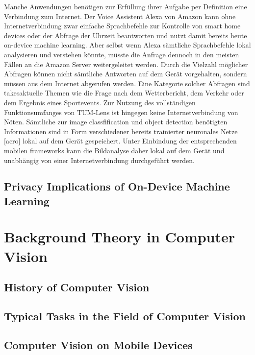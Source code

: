 \documentclass[
			   fontsize=11pt,
               paper=a4,
               bibliography=totoc,
               idxtotoc,
               headsepline,
               footsepline,
               footinclude=false,
               BCOR=12mm,
               DIV=13,
               openany,   %
               ]
               {scrbook}
\begin{document}
Manche Anwendungen benötigen zur Erfüllung ihrer Aufgabe per Definition eine Verbindung zum Internet. Der Voice Assistent Alexa von Amazon kann ohne Internetverbindung zwar einfache Sprachbefehle zur Kontrolle von smart home devices oder der Abfrage der Uhrzeit beantworten \cite{azn_local} und nutzt damit bereits heute on-device machine learning. Aber selbst wenn Alexa sämtliche Sprachbefehle lokal analysieren und verstehen könnte, müsste die Anfrage dennoch in den meisten Fällen an die Amazon Server weitergeleitet werden. Durch die Vielzahl möglicher Abfragen können nicht sämtliche Antworten auf dem Gerät vorgehalten, sondern müssen aus dem Internet abgerufen werden. Eine Kategorie solcher Abfragen sind takesaktuelle Themen wie die Frage nach dem Wetterbericht, dem Verkehr oder dem Ergebnis eines Sportevents. Zur Nutzung des vollständigen Funktionsumfanges von TUM-Lens ist hingegen keine Internetverbindung von Nöten. Sämtliche zur image classfification und object detection benötigten Informationen sind in Form verschiedener bereits trainierter neuronales Netze [acro] lokal auf dem Gerät gespeichert. Unter Einbindung der entsprechenden mobilen frameworks kann die Bildanalyse daher lokal auf dem Gerät und unabhängig von einer Internetverbindung durchgeführt werden.

\section{Privacy Implications of On-Device Machine Learning}



\chapter{Background Theory in Computer Vision}

\section{History of Computer Vision}

\section{Typical Tasks in the Field of Computer Vision}

\section{Computer Vision on Mobile Devices}
\end{document}
